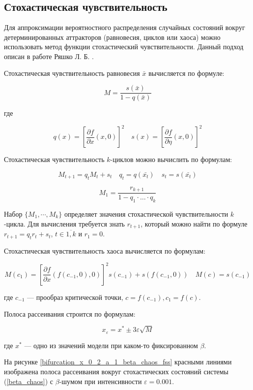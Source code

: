 \subsection{Стохастическая чувствительность}

    Для аппроксимации вероятностного распределения случайных состояний вокруг детерминированных аттракторов (равновесия, циклов или хаоса) можно использовать метод функции стохастический чувствительности. Данный подход описан в работе Ряшко Л. Б. \cite{Ryashko}.

    Стохастическая чувствительность равновесия \(\bar{x}\) вычисляется по формуле:

    \[
        M = \frac{s(\bar{x})}{1 - q(\bar{x})}
    \]

    где 

    \[
        q(x) = \left[\frac{\partial f}{\partial x}(x, 0)\right]^2 \quad s(x) = \left[\frac{\partial f}{\partial \eta}(x, 0)\right]^2
    \]

    Стохастическая чувствительность \(k\)-циклов можно вычислить по формулам:

    \[
        M_{t + 1} = q_t M_t + s_t \quad q_t = q(\bar{x_t}) \quad s_t = s(\bar{x_t})
    \]

    \[
        M_1 = \frac{r_{k + 1}}{1 - q_1 \cdot \ldots \cdot q_k}
    \]

    Набор \(\{M_1, \cdots, M_k\}\) определяет значения стохастической чувствительности \(k\)-цикла. Для вычисления требуется знать \(r_{t + 1}\), который можно найти по формуле \(r_{t + 1} = q_t r_t + s_t\), \(t \in \overline{1, k}\) и \(r_1 = 0\).

    Стохастическая чувствительность хаоса вычисляется по формулам:

    \[
        M(c_1) = \left[\frac{\partial f}{\partial x}(f(c_{-1}, 0), 0)\right]^2 s(c_{-1}) + s(f(c_{-1}, 0)) \quad M(c) = s(c_{-1})
    \]

    где \(c_{-1}\) --- прообраз критической точки, \(c = f(c_{-1}), c_1 = f(c)\).

    Полоса рассеивания строится по формулам: 

    \[
        x_\varepsilon = x^* \pm 3\varepsilon \sqrt{M}
    \]

    где \(x^*\) --- одно из значений модели при каком-то фиксированном \(\beta\).
  
    На рисунке \ref{bifurcation_x_0_2_a_1_beta_chaos_fss} красными линиями изображена полоса рассеивания вокруг стохастических состояний системы (\ref{beta_chaos}) с \(\beta\)-шумом при интенсивности \(\varepsilon = 0.001\). 

